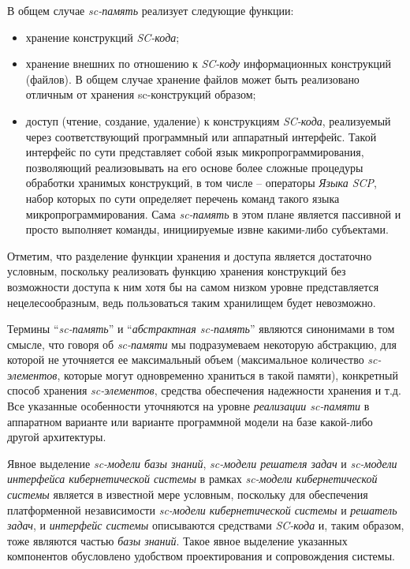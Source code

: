 В общем случае \textit{sc-память} реализует следующие функции:
\begin{itemize}
	\item хранение конструкций \textit{SC-кода};
	\item хранение внешних по отношению к \textit{SC-коду} информационных конструкций (файлов). В общем случае хранение файлов может быть реализовано отличным от хранения sc-конструкций образом;	
	\item доступ (чтение, создание, удаление) к конструкциям \textit{SC-кода}, реализуемый через соответствующий программный или аппаратный интерфейс. Такой интерфейс по сути представляет собой язык микропрограммирования, позволяющий реализовывать на его основе более сложные процедуры обработки хранимых конструкций, в том числе -- операторы \textit{Языка SCP}, набор которых по сути определяет перечень команд такого языка микропрограммирования. Сама \textit{sc-память} в этом плане является пассивной и просто выполняет команды, инициируемые извне какими-либо субъектами.
\end{itemize}	

Отметим, что разделение функции хранения и доступа является достаточно условным, поскольку реализовать функцию хранения конструкций без возможности доступа к ним хотя бы на самом низком уровне представляется нецелесообразным, ведь пользоваться таким хранилищем будет невозможно.

Термины ``\textit{sc-память}'' и ``\textit{абстрактная sc-память}'' являются синонимами в том смысле, что говоря об \textit{sc-памяти} мы подразумеваем некоторую абстракцию, для которой не уточняется ее максимальный объем (максимальное количество \textit{sc-элементов}, которые могут одновременно храниться в такой памяти), конкретный способ хранения \textit{sc-элементов}, средства обеспечения надежности хранения и т.д. Все указанные особенности уточняются на уровне \textit{реализации sc-памяти} в аппаратном варианте или варианте программной модели на базе какой-либо другой архитектуры.

Явное выделение \textit{sc-модели базы знаний}, \textit{sc-модели решателя задач} и \textit{sc-модели интерфейса кибернетической системы} в рамках \textit{sc-модели кибернетической системы} является в известной мере условным, поскольку для обеспечения платформенной независимости \textit{sc-модели кибернетической системы} и \textit{решатель задач}, и \textit{интерфейс системы} описываются средствами \textit{SC-кода} и, таким образом, тоже являются частью \textit{базы знаний}. Такое явное выделение указанных компонентов обусловлено удобством проектирования и сопровождения системы.

